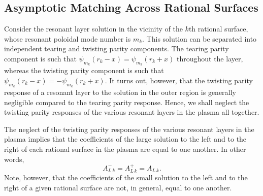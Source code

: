 \documentclass[12pt,prb,aps]{revtex4-1}
\begin{document}
\subsection{Asymptotic Matching Across  Rational Surfaces}\label{sa7}
Consider the resonant layer solution in the vicinity of the $k$th  rational surface, whose resonant poloidal mode number is $m_k$. 
This solution can be separated into independent tearing and twisting parity components.\cite{ggj}
The tearing parity   component is such that $\psi_{m_k}(r_k-x)=\psi_{m_k}(r_k+x)$ throughout the layer, whereas the  twisting parity component is such that
$\psi_{m_k}(r_k-x)=-\psi_{m_k}(r_k+x)$. It turns out, however, that the twisting parity response of a resonant layer to the solution in the outer region is generally negligible compared to the tearing parity response.\cite{connor,twist,am3}
Hence,  we shall neglect the twisting parity responses of the various resonant layers  in the plasma all together. 

The neglect of the twisting parity responses of the various resonant layers in the plasma implies that the coefficients of the large solution to the left and to the right of
each rational surface in the plasma are equal to one another.\cite{am1} In other words,
\begin{equation}\label{tear}
A_{L\,k}^- = A_{L\,k}^+= A_{L\,k}.
\end{equation}
 Note, however, that the coefficients of the small solution to the left and to the right of a given rational surface are not, in general, equal to one another. 
\end{document}

